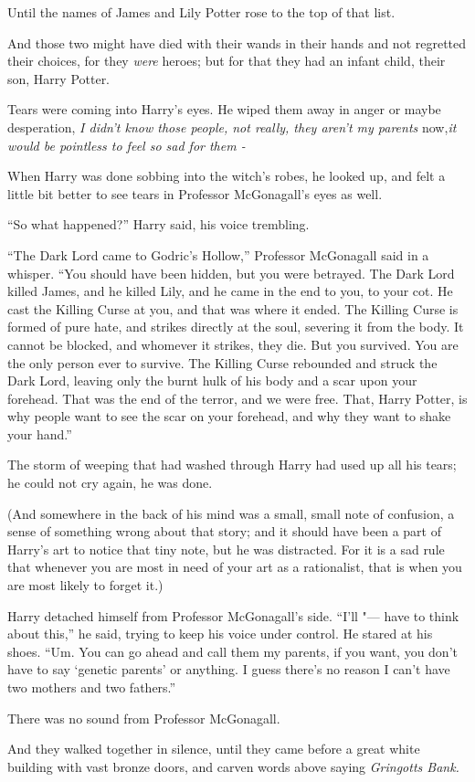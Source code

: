 Until the names of James and Lily Potter rose to the top of that list.

And those two might have died with their wands in their hands and not
regretted their choices, for they \emph{were} heroes; but for that they
had an infant child, their son, Harry Potter.

Tears were coming into Harry's eyes. He wiped them away in anger or
maybe desperation, \emph{I didn't know those people, not really, they
aren't my parents} now,\emph{it would be pointless to feel so sad for
them -}

When Harry was done sobbing into the witch's robes, he looked up, and
felt a little bit better to see tears in Professor McGonagall's eyes as
well.

``So what happened?'' Harry said, his voice trembling.

``The Dark Lord came to Godric's Hollow,'' Professor McGonagall said in
a whisper. ``You should have been hidden, but you were betrayed. The
Dark Lord killed James, and he killed Lily, and he came in the end to
you, to your cot. He cast the Killing Curse at you, and that was where
it ended. The Killing Curse is formed of pure hate, and strikes directly
at the soul, severing it from the body. It cannot be blocked, and
whomever it strikes, they die. But you survived. You are the only person
ever to survive. The Killing Curse rebounded and struck the Dark Lord,
leaving only the burnt hulk of his body and a scar upon your forehead.
That was the end of the terror, and we were free. That, Harry Potter, is
why people want to see the scar on your forehead, and why they want to
shake your hand.''

The storm of weeping that had washed through Harry had used up all his
tears; he could not cry again, he was done.

(And somewhere in the back of his mind was a small, small note of
confusion, a sense of something wrong about that story; and it should
have been a part of Harry's art to notice that tiny note, but he was
distracted. For it is a sad rule that whenever you are most in need of
your art as a rationalist, that is when you are most likely to forget
it.)

Harry detached himself from Professor McGonagall's side. ``I'll "--- have
to think about this,'' he said, trying to keep his voice under control.
He stared at his shoes. ``Um. You can go ahead and call them my parents,
if you want, you don't have to say `genetic parents' or anything. I
guess there's no reason I can't have two mothers and two fathers.''

There was no sound from Professor McGonagall.

And they walked together in silence, until they came before a great
white building with vast bronze doors, and carven words above saying
\emph{Gringotts Bank.}
